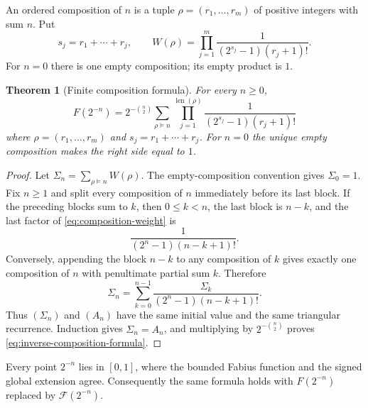 \documentclass[11pt,oneside]{article}
\newtheorem{theorem}{Theorem}[section]
\theoremstyle{definition}
\theoremstyle{remark}
\begin{document}
An ordered composition of $n$ is a tuple
$\rho=(r_1,\ldots,r_m)$ of positive integers with sum $n$.  Put
\begin{equation}
 s_j=r_1+\cdots+r_j,
 \qquad
 W(\rho)=\prod_{j=1}^{m}
 \frac{1}{(2^{s_j}-1)(r_j+1)!}.                          \label{eq:composition-weight}
\end{equation}
For $n=0$ there is one empty composition; its empty product is $1$.

\begin{theorem}[Finite composition formula]
For every $n\ge0$,
\begin{equation}
 \boxed{
 F(2^{-n})=2^{-\binom n2}
 \sum_{\rho\vDash n}
 \prod_{j=1}^{\operatorname{len}(\rho)}
 \frac{1}{(2^{s_j}-1)(r_j+1)!}}
                                                               \label{eq:inverse-composition-formula}
\end{equation}
where $\rho=(r_1,\ldots,r_m)$ and $s_j=r_1+\cdots+r_j$.
For $n=0$ the unique empty composition makes the right side equal to $1$.
\end{theorem}

\begin{proof}
Let $\Sigma_n=\sum_{\rho\vDash n}W(\rho)$.  The empty-composition convention gives
$\Sigma_0=1$.
Fix $n\ge1$ and split every composition of $n$ immediately before its last block.  If the
preceding blocks sum to $k$, then $0\le k<n$, the last block is $n-k$, and the last factor
of \eqref{eq:composition-weight} is
\begin{equation*}
 \frac{1}{(2^n-1)(n-k+1)!}.
\end{equation*}
Conversely, appending the block $n-k$ to any composition of $k$ gives exactly one
composition of $n$ with penultimate partial sum $k$.  Therefore
\begin{equation*}
 \Sigma_n=\sum_{k=0}^{n-1}
 \frac{\Sigma_k}{(2^n-1)(n-k+1)!}.
\end{equation*}
Thus $(\Sigma_n)$ and $(A_n)$ have the same initial value and the same triangular
recurrence.
Induction gives $\Sigma_n=A_n$, and multiplying by $2^{-\binom n2}$ proves
\eqref{eq:inverse-composition-formula}.
\end{proof}

Every point $2^{-n}$ lies in $[0,1]$, where the bounded Fabius function and the signed
global extension agree.  Consequently the same formula holds with $F(2^{-n})$ replaced
by $\mathcal F(2^{-n})$.
\end{document}
